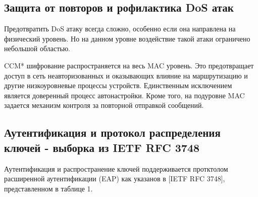 \subsection{Защита от повторов и рофилактика DoS атак}

Предотвратить DoS атаку всегда сложно, особенно если она направлена на физический уровень. Но на данном уровне воздействие такой атаки ограничено небольшой областью.

CCM* шифрование распространяется на весь MAC уровень. Это предотвращает доступ в сеть неавторизованных и оказывающих влияние на маршрутизацию и другие низкоуровневые процессы устройств. Единственным исключением является доверенный процесс автонастройки. Кроме того, на подуровне MAC задается механизм контроля за повторной отправкой сообщений.

\subsection{Аутентификация и протокол распределения ключей - выборка из IETF RFC 3748}

Аутентификация и распространение ключей поддерживается протктолом расширенной аутентификации (EAP) как указанов в [IETF RFC 3748], представленном в таблице 1.%

